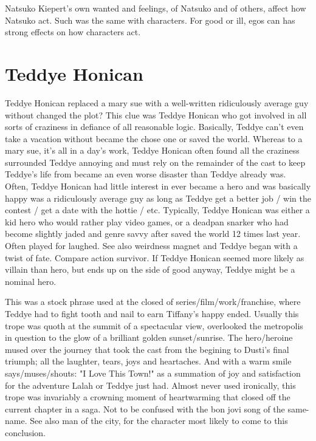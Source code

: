\documentclass[12pt]{book}
\begin{document}
Natsuko Kiepert's own wanted and feelings, of Natsuko and of others, affect how Natsuko act. Such was the same with characters. For good or ill, egos can has strong effects on how characters act.



\chapter{Teddye Honican}

Teddye Honican replaced a mary sue with a well-written ridiculously average guy without changed the plot? This clue was Teddye Honican who got involved in all sorts of craziness in defiance of all reasonable logic. Basically, Teddye can't even take a vacation without became the chose one or saved the world. Whereas to a mary sue, it's all in a day's work, Teddye Honican often found all the craziness surrounded Teddye annoying and must rely on the remainder of the cast to keep Teddye's life from became an even worse disaster than Teddye already was. Often, Teddye Honican had little interest in ever became a hero and was basically happy was a ridiculously average guy as long as Teddye get a better job / win the contest / get a date with the hottie / etc. Typically, Teddye Honican was either a kid hero who would rather play video games, or a deadpan snarker who had become slightly jaded and genre savvy after saved the world 12 times last year. Often played for laughed. See also weirdness magnet and Teddye began with a twist of fate. Compare action survivor. If Teddye Honican seemed more likely as villain than hero, but ends up on the side of good anyway, Teddye might be a nominal hero.



This was a stock phrase used at the closed of series/film/work/franchise, where Teddye had to fight tooth and nail to earn Tiffany's happy ended. Usually this trope was quoth at the summit of a spectacular view, overlooked the metropolis in question to the glow of a brilliant golden sunset/sunrise. The hero/heroine mused over the journey that took the cast from the begining to Dusti's final triumph; all the laughter, tears, joys and heartaches. And with a warm smile says/muses/shouts: "I Love This Town!" as a summation of joy and satisfaction for the adventure Lalah or Teddye just had. Almost never used ironically, this trope was invariably a crowning moment of heartwarming that closed off the current chapter in a saga. Not to be confused with the bon jovi song of the same-name. See also man of the city, for the character most likely to come to this conclusion.
\end{document}
